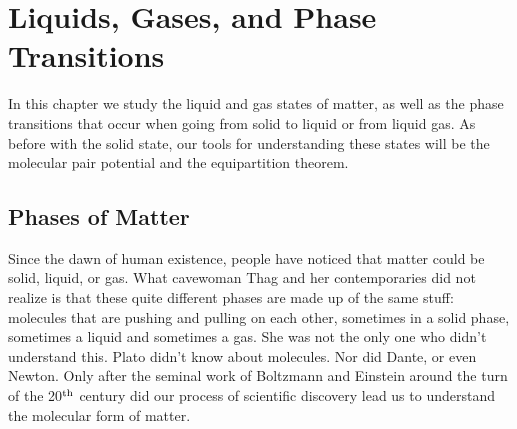 \chapter{Liquids, Gases, and Phase Transitions}
\label{chapter:liquids_and_gases}

%
%
%
%
%
%


In this chapter we study the liquid and gas states of matter, as
well as the phase transitions that occur when going from solid to
liquid or from liquid gas.  As before with the solid state, our tools
for understanding these states will be the molecular pair potential
and the equipartition theorem.

\section{Phases of Matter}


Since the dawn of human existence, people have noticed that
matter could be solid, liquid, or gas.  What cavewoman Thag and her
contemporaries did not realize is that these quite different phases
are made up of the same stuff: molecules that are 
pushing and pulling on each other, sometimes in a solid phase, sometimes
a liquid and sometimes a gas.  
She was not the only one who didn't understand this.  Plato didn't
know about molecules.  Nor did Dante, or even Newton.  Only after the
seminal work of Boltzmann and Einstein around the turn of the 20$^{\rm th}$ 
century did our process of scientific discovery lead us to understand the
molecular form of matter.  

